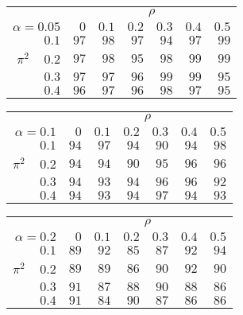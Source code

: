 \begin{tabular}{r|rrrrrr}
\hline\hline
 &\multicolumn{6}{c}{$\rho$} \\ 
 $\alpha = 0.05$ & $0$ & $0.1$ & $0.2$ & $0.3$ & $0.4$ & $0.5$ \\ 
 \hline$0.1$ & $97$ & $98$ & $97$ & $94$ & $97$ & $99$\\ 
$\pi^2\;\;\;$ $0.2$ & $97$ & $98$ & $95$ & $98$ & $99$ & $99$\\ 
$0.3$ & $97$ & $97$ & $96$ & $99$ & $99$ & $95$\\ 
$0.4$ & $96$ & $97$ & $96$ & $98$ & $97$ & $95$\\ 
 \hline 
 \end{tabular}
 
 \vspace{2em} 
 
\begin{tabular}{r|rrrrrr}
\hline\hline
 &\multicolumn{6}{c}{$\rho$} \\ 
 $\alpha = 0.1$ & $0$ & $0.1$ & $0.2$ & $0.3$ & $0.4$ & $0.5$ \\ 
 \hline$0.1$ & $94$ & $97$ & $94$ & $90$ & $94$ & $98$\\ 
$\pi^2\;\;\;$ $0.2$ & $94$ & $94$ & $90$ & $95$ & $96$ & $96$\\ 
$0.3$ & $94$ & $93$ & $94$ & $96$ & $96$ & $92$\\ 
$0.4$ & $94$ & $93$ & $94$ & $97$ & $94$ & $93$\\ 
 \hline 
 \end{tabular}
 
 \vspace{2em} 
 
\begin{tabular}{r|rrrrrr}
\hline\hline
 &\multicolumn{6}{c}{$\rho$} \\ 
 $\alpha = 0.2$ & $0$ & $0.1$ & $0.2$ & $0.3$ & $0.4$ & $0.5$ \\ 
 \hline$0.1$ & $89$ & $92$ & $85$ & $87$ & $92$ & $94$\\ 
$\pi^2\;\;\;$ $0.2$ & $89$ & $89$ & $86$ & $90$ & $92$ & $90$\\ 
$0.3$ & $91$ & $87$ & $88$ & $90$ & $88$ & $86$\\ 
$0.4$ & $91$ & $84$ & $90$ & $87$ & $86$ & $86$\\ 
 \hline 
 \end{tabular}